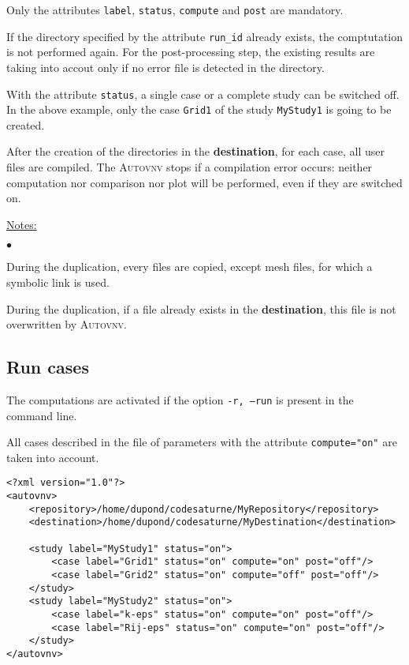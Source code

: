 \documentclass[a4paper,10pt,twoside]{csshortdoc}
\begin{document}
Only the attributes \texttt{label}, \texttt{status}, \texttt{compute}
and \texttt{post} are mandatory.

If the directory specified by the attribute \texttt{run\_id} already exists,
the comptutation is not performed again. For the post-processing step, the existing
results are taking into accout only if no error file is detected in the
directory.

With the attribute \texttt{status}, a single case or a complete study can be
switched off. In the above example, only the case \texttt{Grid1} of the study
\texttt{MyStudy1} is going to be created.

After the creation of the directories in the \textbf{destination}, for each
case, all user files are compiled. The \textsc{Autovnv} stops if a compilation
error occurs: neither computation nor comparison nor plot will be performed,
even if they are switched on.

\underline{Notes:}

\begin{list}{$\bullet$}{}
\item During the duplication, every files are copied, except mesh files, for
which a symbolic link is used.
\item During the duplication, if a file already exists in the
\textbf{destination}, this file is not overwritten by \textsc{Autovnv}.
\end{list}


\subsection{Run cases}\label{sec:run}

The computations are activated if the option \texttt{-r, --run} is present in
the command line.

All cases described in the file of parameters with the attribute
\texttt{compute="on"} are taken into account.

\small
\begin{verbatim}
<?xml version="1.0"?>
<autovnv>
    <repository>/home/dupond/codesaturne/MyRepository</repository>
    <destination>/home/dupond/codesaturne/MyDestination</destination>

    <study label="MyStudy1" status="on">
        <case label="Grid1" status="on" compute="on" post="off"/>
        <case label="Grid2" status="on" compute="off" post="off"/>
    </study>
    <study label="MyStudy2" status="on">
        <case label="k-eps" status="on" compute="on" post="off"/>
        <case label="Rij-eps" status="on" compute="on" post="off"/>
    </study>
</autovnv>
\end{verbatim}
\normalsize
\end{document}
